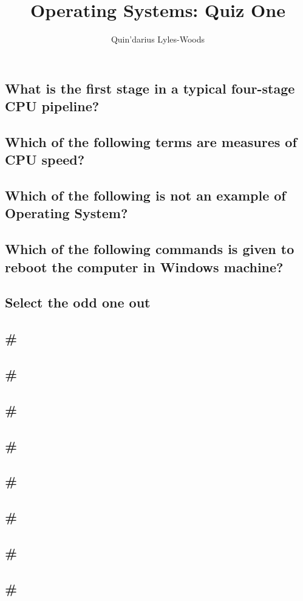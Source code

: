 \documentclass{article}
\title{Operating Systems: Quiz One}
\author{Quin'darius Lyles-Woods}
\begin{document}
\maketitle
\subsection{What is the first stage in a typical four-stage CPU pipeline?}
\subsection{Which of the following terms are measures of CPU speed?}
\subsection{Which of the following is not an example of Operating System?}
\subsection{Which of the following commands is given to reboot the computer in Windows machine?}
\subsection{Select the odd one out}
\subsection{#}
\subsection{#}
\subsection{#}
\subsection{#}
\subsection{#}
\subsection{#}
\subsection{#}
\subsection{#}
\end{document}
